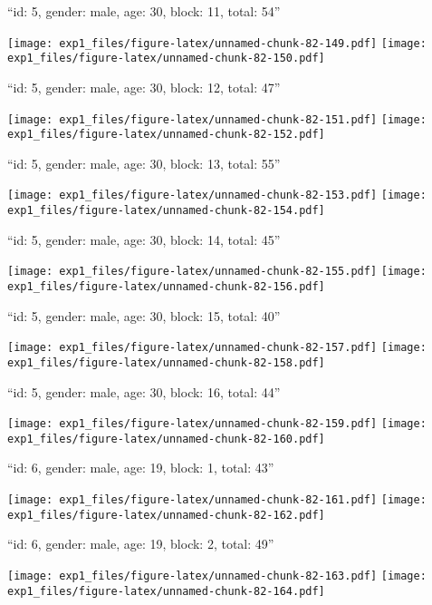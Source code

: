 \documentclass[11pt,,]{article}
\begin{document}
\newpage
[1] 

``id: 5, gender: male, age: 30, block: 11, total: 54''

\texttt{[image: exp1\_files/figure-latex/unnamed-chunk-82-149.pdf]}
\texttt{[image: exp1\_files/figure-latex/unnamed-chunk-82-150.pdf]}

\newpage
[1] 

``id: 5, gender: male, age: 30, block: 12, total: 47''

\texttt{[image: exp1\_files/figure-latex/unnamed-chunk-82-151.pdf]}
\texttt{[image: exp1\_files/figure-latex/unnamed-chunk-82-152.pdf]}

\newpage
[1] 

``id: 5, gender: male, age: 30, block: 13, total: 55''

\texttt{[image: exp1\_files/figure-latex/unnamed-chunk-82-153.pdf]}
\texttt{[image: exp1\_files/figure-latex/unnamed-chunk-82-154.pdf]}

\newpage
[1] 

``id: 5, gender: male, age: 30, block: 14, total: 45''

\texttt{[image: exp1\_files/figure-latex/unnamed-chunk-82-155.pdf]}
\texttt{[image: exp1\_files/figure-latex/unnamed-chunk-82-156.pdf]}

\newpage
[1] 

``id: 5, gender: male, age: 30, block: 15, total: 40''

\texttt{[image: exp1\_files/figure-latex/unnamed-chunk-82-157.pdf]}
\texttt{[image: exp1\_files/figure-latex/unnamed-chunk-82-158.pdf]}

\newpage
[1] 

``id: 5, gender: male, age: 30, block: 16, total: 44''

\texttt{[image: exp1\_files/figure-latex/unnamed-chunk-82-159.pdf]}
\texttt{[image: exp1\_files/figure-latex/unnamed-chunk-82-160.pdf]}

\newpage
[1] 

``id: 6, gender: male, age: 19, block: 1, total: 43''

\texttt{[image: exp1\_files/figure-latex/unnamed-chunk-82-161.pdf]}
\texttt{[image: exp1\_files/figure-latex/unnamed-chunk-82-162.pdf]}

\newpage
[1] 

``id: 6, gender: male, age: 19, block: 2, total: 49''

\texttt{[image: exp1\_files/figure-latex/unnamed-chunk-82-163.pdf]}
\texttt{[image: exp1\_files/figure-latex/unnamed-chunk-82-164.pdf]}
\end{document}
